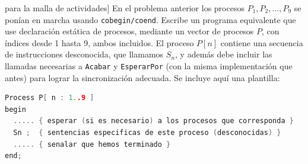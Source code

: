 \begin{ejercicio}[10: Vector de procesos estáticos P[n: 1..9] para la malla de actividades]
En el problema anterior los procesos $P_1, P_2, \dots, P_9$ se ponían en marcha usando \texttt{cobegin/coend}. Escribe un programa equivalente que use declaración estática de procesos, mediante un vector de procesos $P$, con índices desde 1 hasta 9, ambos incluidos. El proceso $P[n]$ contiene una secuencia de instrucciones desconocida, que llamamos $S_n$, y además debe incluir las llamadas necesarias a \texttt{Acabar} y \texttt{EsperarPor} (con la misma implementación que antes) para lograr la sincronización adecuada. Se incluye aquí una plantilla:

\begin{lstlisting}[language=C++]
Process P[ n : 1..9 ]
begin
  ..... { esperar (si es necesario) a los procesos que corresponda }
  Sn ;  { sentencias especificas de este proceso (desconocidas) }
  ..... { senalar que hemos terminado }
end;
\end{lstlisting}
\end{ejercicio}

